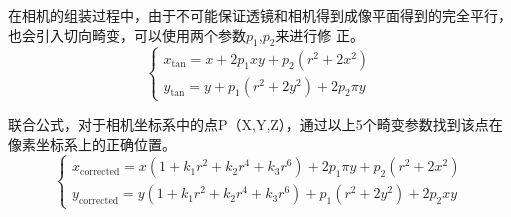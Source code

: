 在相机的组装过程中，由于不可能保证透镜和相机得到成像平面得到的完全平行，也会引入切向畸变，可以使用两个参数$p_1$,$p_2$来进行修
正。
\begin{equation}
  \left\{\begin{array}{l}{x_{\tan }=x+2 p_{1} x y+p_{2}\left(r^{2}+2 x^{2}\right)} \\ {y_{\tan }=y+p_{1}\left(r^{2}+2 y^{2}\right)+2 p_{2} \pi y}\end{array}\right.
\end{equation}

联合公式，对于相机坐标系中的点P（X,Y,Z），通过以上5个畸变参数找到该点在像素坐标系上的正确位置。
\begin{equation}
  \left\{\begin{array}{l}{x_{\text {corrected}}=x\left(1+k_{1} r^{2}+k_{2} r^{4}+k_{3} r^{6}\right)+2 p_{1} \pi y+p_{2}\left(r^{2}+2 x^{2}\right)} \\ {y_{\text {corrected}}=y\left(1+k_{1} r^{2}+k_{2} r^{4}+k_{3} r^{6}\right)+p_{1}\left(r^{2}+2 y^{2}\right)+2 p_{2} x y}\end{array}\right.
\end{equation}


